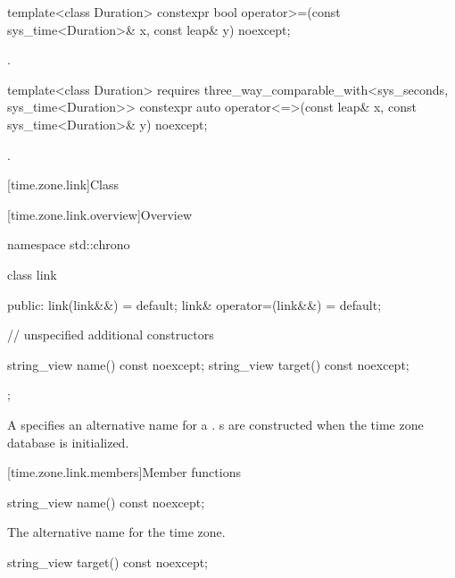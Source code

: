 %
%
\begin{itemdecl}
template<class Duration>
  constexpr bool operator>=(const sys_time<Duration>& x, const leap& y) noexcept;
\end{itemdecl}

\begin{itemdescr}
\pnum
\returns
{}.
\end{itemdescr}

%
%
\begin{itemdecl}
template<class Duration>
  requires three_way_comparable_with<sys_seconds, sys_time<Duration>>
  constexpr auto operator<=>(const leap& x, const sys_time<Duration>& y) noexcept;
\end{itemdecl}

\begin{itemdescr}
\pnum
\returns
{}.
\end{itemdescr}

[time.zone.link]{Class }

[time.zone.link.overview]{Overview}

\begin{codeblock}
namespace std::chrono {
  class link {
  public:
    link(link&&)            = default;
    link& operator=(link&&) = default;

    // unspecified additional constructors

    string_view name()   const noexcept;
    string_view target() const noexcept;
  };
}
\end{codeblock}

\pnum
A  specifies an alternative name for a .
s are constructed when the time zone database is initialized.

[time.zone.link.members]{Member functions}

%
\begin{itemdecl}
string_view name() const noexcept;
\end{itemdecl}

\begin{itemdescr}
\pnum
\returns
The alternative name for the time zone.
\end{itemdescr}

%
\begin{itemdecl}
string_view target() const noexcept;
\end{itemdecl}

